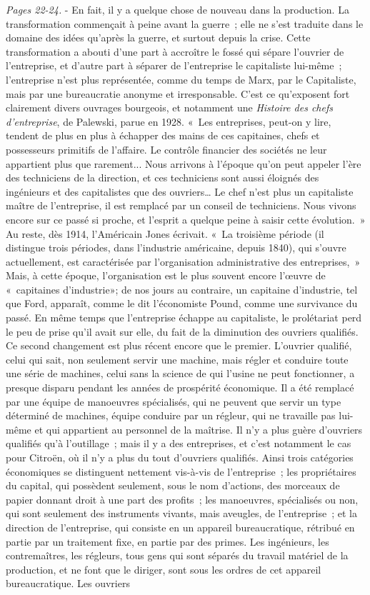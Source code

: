 \documentclass[french,twoside]{book} %
\begin{document}
{\itshape Pages 22-24.} - En fait, il y a quelque chose de nouveau dans la production. La transformation commençait à peine avant la guerre ; elle ne s'est traduite dans le domaine des idées qu'après la guerre, et surtout depuis la crise. Cette transformation a abouti d'une part à accroître le fossé qui sépare l'ouvrier de l'entreprise, et d'autre part à séparer de l'entreprise le capitaliste lui-même ; l'entreprise n'est plus représentée, comme du temps de Marx, par le Capitaliste, mais par une bureaucratie anonyme et irresponsable. C'est ce qu'exposent fort clairement divers ouvrages bourgeois, et notamment une {\itshape Histoire des chefs d'entreprise}, de Palewski, parue en 1928. « Les entreprises, peut-on y lire, tendent de plus en plus à échapper des mains de ces capitaines, chefs et possesseurs primitifs de l'affaire. Le contrôle financier des sociétés ne leur appartient plus que rarement... Nous arrivons à l'époque qu'on peut appeler l'ère des techniciens de la direction, et ces techniciens sont aussi éloignés des ingénieurs et des capitalistes que des ouvriers… Le chef n'est plus un capitaliste maître de l'entreprise, il est remplacé par un conseil de techniciens. Nous vivons encore sur ce passé si proche, et l'esprit a quelque peine à saisir cette évolution. » Au reste, dès 1914, l'Américain Jones écrivait. « La troisième période (il distingue trois périodes, dans l'industrie américaine, depuis 1840), qui s'ouvre actuellement, est caractérisée par l'organisation administrative des entreprises, » Mais, à cette époque, l'organisation est le plus souvent encore l’œuvre de « capitaines d'industrie»; de nos jours au contraire, un capitaine d'industrie, tel que Ford, apparaît, comme le dit l'économiste Pound, comme une survivance du passé. En même temps que l'entreprise échappe au capitaliste, le prolétariat perd le peu de prise qu'il avait sur elle, du fait de la diminution des ouvriers qualifiés. Ce second changement est plus récent encore que le premier. L'ouvrier qualifié, celui qui sait, non seulement servir une machine, mais régler et conduire toute une série de machines, celui sans la science de qui l'usine ne peut fonctionner, a presque disparu pendant les années de prospérité économique. Il a été remplacé par une équipe de manoeuvres spécialisés, qui ne peuvent que servir un type déterminé de machines, équipe conduire par un régleur, qui ne travaille pas lui-même et qui appartient au personnel de la maîtrise. Il n'y a plus guère d'ouvriers qualifiés qu'à l'outillage ; mais il y a des entreprises, et c'est notamment le cas pour Citroën, où il n'y a plus du tout d'ouvriers qualifiés. Ainsi trois catégories économiques se distinguent nettement vis-à-vis de l'entreprise ; les propriétaires du capital, qui possèdent seulement, sous le nom d'actions, des morceaux de papier donnant droit à une part des profits ; les manoeuvres, spécialisés ou non, qui sont seulement des instruments vivants, mais aveugles, de l'entreprise ; et la direction de l'entreprise, qui consiste en un appareil bureaucratique, rétribué en partie par un traitement fixe, en partie par des primes. Les ingénieurs, les contremaîtres, les régleurs, tous gens qui sont séparés du travail matériel de la production, et ne font que le diriger, sont sous les ordres de cet appareil bureaucratique. Les ouvriers 
\end{document}
